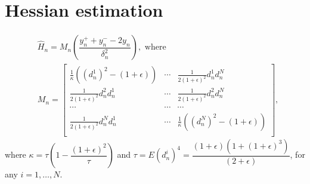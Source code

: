 \section{Hessian estimation}
\begin{align}
\label{eq:2rdsa-estimate-ber}
&\widehat H_n = M_n \left(\dfrac{y_n^+ + y_n^- - 2 y_n}{\delta_n^2}\right), \text{ where }\\
& M_n =
\left[
\begin{array}{ccc}
\frac{1}{\kappa}\left((d_n^1)^2\!-(1+\epsilon)\right) & \cdots & \frac{1}{2(1+\epsilon)^2}d_n^1 d_n^N\\
\frac{1}{2(1+\epsilon)^2}d_n^2 d_n^1  &  \cdots & \frac{1}{2(1+\epsilon)^2}d_n^2 d_n^N\\
\cdots&\cdots&\cdots\\
\frac{1}{2(1+\epsilon)^2}d_n^N d_n^1 & \cdots &  \frac{1}{\kappa}\left((d_n^N)^2-(1+\epsilon)\right) \\
\end{array}
\right],\nonumber
\end{align}
where $\kappa = \tau \left(1- \dfrac{(1+\epsilon)^2}{\tau}\right)$ and $\tau = E (d_n^i)^4= \dfrac{(1+\epsilon)(1+(1+\epsilon)^3)}{(2+\epsilon)}$, for any $i=1,\ldots,N$. 

